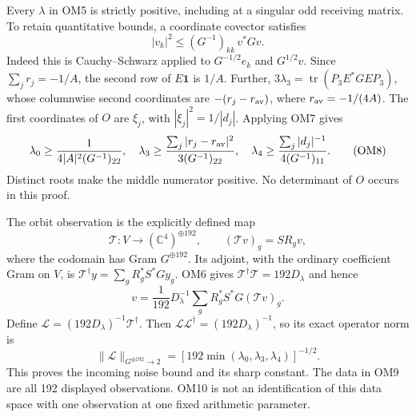 \documentclass[11pt]{article}
\newcommand{\C}{\mathbb C}
\newcommand{\tr}{\operatorname{tr}}
\newcommand{\one}{\mathbf 1}
\begin{document}
Every $\lambda$ in OM5 is strictly positive, including at a singular
odd receiving matrix.  To retain quantitative bounds, a coordinate
covector satisfies
\[
|v_k|^2\le (G^{-1})_{kk}\,v^*Gv.
\tag{OM7}
\]
Indeed this is Cauchy--Schwarz applied to $G^{-1/2}e_k$ and
$G^{1/2}v$.  Since $\sum_jr_j=-1/A$, the second row of $E\one$
is $1/A$.  Further,
$3\lambda_3=\tr(P_3E^*GE P_3)$, whose columnwise second coordinates
are $-(r_j-r_{\rm av})$, where $r_{\rm av}=-1/(4A)$.
The first coordinates of $O$ are $\xi_j$, with
$|\xi_j|^2=1/|d_j|$.  Applying OM7 gives
\[
\lambda_0\ge\frac1{4|A|^2(G^{-1})_{22}},\quad
\lambda_3\ge
\frac{\sum_j|r_j-r_{\rm av}|^2}{3(G^{-1})_{22}},\quad
\lambda_4\ge\frac{\sum_j|d_j|^{-1}}{4(G^{-1})_{11}}.
\tag{OM8}
\]
Distinct roots make the middle numerator positive.  No determinant
of $O$ occurs in this proof.

The orbit observation is the explicitly defined map
\[
\mathcal T:V\longrightarrow(\C^4)^{\oplus192},\qquad
(\mathcal Tv)_g=S R_gv,
\tag{OM9}
\]
where the codomain has Gram $G^{\oplus192}$.  Its adjoint, with the
ordinary coefficient Gram on $V$, is
$\mathcal T^\dagger y=\sum_g R_g^*S^*G y_g$.
OM6 gives $\mathcal T^\dagger\mathcal T=192D_\lambda$ and hence
\[
v=\frac1{192}D_\lambda^{-1}\sum_gR_g^*S^*G(\mathcal Tv)_g.
\tag{OM10}
\]
Define $\mathcal L=(192D_\lambda)^{-1}\mathcal T^\dagger$.
Then
$\mathcal L\mathcal L^\dagger=(192D_\lambda)^{-1}$, so its exact
operator norm is
\[
\|\mathcal L\|_{G^{\oplus192}\to2}
=[192\min(\lambda_0,\lambda_3,\lambda_4)]^{-1/2}.
\tag{OM11}
\]
This proves the incoming noise bound and its sharp constant.
The data in OM9 are all 192 displayed observations.  OM10 is not
an identification of this data space with one observation at one
fixed arithmetic parameter.
\end{document}
